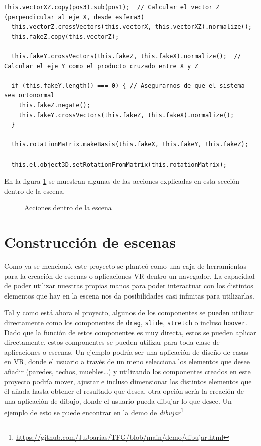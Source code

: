 \documentclass[a4paper, 12pt]{book}
\begin{document}
\begin{itemize}
\begin{lstlisting}[caption=Creación del falso eje de coordenadas, captionpos=b, label=lst:fake_coords]
  this.vectorXZ.copy(pos3).sub(pos1);  // Calcular el vector Z (perpendicular al eje X, desde esfera3)
  this.vectorZ.crossVectors(this.vectorX, this.vectorXZ).normalize();
  this.fakeZ.copy(this.vectorZ);

  this.fakeY.crossVectors(this.fakeZ, this.fakeX).normalize();  // Calcular el eje Y como el producto cruzado entre X y Z
  
  if (this.fakeY.length() === 0) { // Asegurarnos de que el sistema sea ortonormal
    this.fakeZ.negate();
    this.fakeY.crossVectors(this.fakeZ, this.fakeX).normalize();
  }
  
  this.rotationMatrix.makeBasis(this.fakeX, this.fakeY, this.fakeZ);
  
  this.el.object3D.setRotationFromMatrix(this.rotationMatrix); 
\end{lstlisting}
\end{itemize}

En la figura \ref{fig:mosaico} se muestran algunas de las acciones explicadas en esta sección dentro de la escena.
\begin{figure}[H] 
  \centering
  \fbox{\rule{0pt}{150pt} \rule{0.7\textwidth}{0pt}} 
  \caption{Acciones dentro de la escena}
  \label{fig:mosaico}
\end{figure}

\section{Construcción de escenas}
\label{sec:escenas}

Como ya se mencionó, este proyecto se planteó como una caja de herramientas para la creación de escenas o aplicaciones VR dentro un navegador. La capacidad de poder utilizar nuestras propias manos para poder interactuar con los distintos elementos que hay en la escena nos da posibilidades casi infinitas para utilizarlas. 

Tal y como está ahora el proyecto, algunos de los componentes se pueden utilizar directamente como los componentes de \texttt{drag}, \texttt{slide}, \texttt{stretch} o incluso \texttt{hoover}. Dado que la función de estos componentes es muy directa, estos se pueden aplicar directamente, estos componentes se pueden utilizar para toda clase de aplicaciones o escenas. Un ejemplo podría ser una aplicación de diseño de casas en VR,
donde el usuario a través de un meno selecciona los elementos que desee añadir (paredes, techos, muebles…) y utilizando los componentes creados en este proyecto podría mover, ajustar e incluso dimensionar los distintos elementos que él añada hasta obtener el resultado que desea, otra opción sería la creación de una aplicación de dibujo, donde el usuario pueda dibujar lo que desee. Un ejemplo de esto se puede encontrar en la demo de \textit{dibujar}\footnote{\url{https://github.com/JuJoarias/TFG/blob/main/demo/dibujar.html}} 
\end{document}
